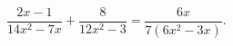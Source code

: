 \begin{ex}[type=equation]
	\begin{condition}
		$\dfrac{2x - 1}{14x^2 - 7x} + \dfrac{8}{12x^2 - 3} = \dfrac{6x}{7\left(6x^2 - 3x\right)}.$
	\end{condition}
\end{ex}